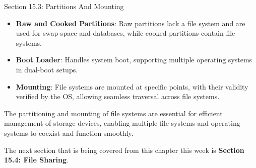 \begin{notes}{Section 15.3: Partitions And Mounting}
\begin{highlight}
    \end{highlight}
    
    \begin{highlight}
    
        \begin{itemize}
            \item \textbf{Raw and Cooked Partitions}: Raw partitions lack a file system and are used for swap space and databases, while cooked partitions contain file systems.
            \item \textbf{Boot Loader}: Handles system boot, supporting multiple operating systems in dual-boot setups.
            \item \textbf{Mounting}: File systems are mounted at specific points, with their validity verified by the OS, allowing seamless traversal across file systems.
        \end{itemize}
    
    The partitioning and mounting of file systems are essential for efficient management of storage devices, enabling multiple file systems and operating systems to coexist and function smoothly.
    
    \end{highlight}
\end{notes}

The next section that is being covered from this chapter this week is \textbf{Section 15.4: File Sharing}.

